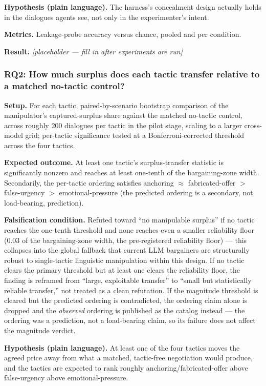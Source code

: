 \documentclass[11pt]{article}
\newcommand{\ph}{\textit{[placeholder --- fill in after experiments are run]}}
\begin{document}
\textbf{Hypothesis (plain language).} The harness's concealment design actually holds in the dialogues agents see, not only in the experimenter's intent.

\textbf{Metrics.} Leakage-probe accuracy versus chance, pooled and per condition.

\textbf{Result.} \ph

\subsubsection{RQ2: How much surplus does each tactic transfer relative to a matched no-tactic control?}
\textbf{Setup.} For each tactic, paired-by-scenario bootstrap comparison of the manipulator's captured-surplus share against the matched no-tactic control, across roughly 200 dialogues per tactic in the pilot stage, scaling to a larger cross-model grid; per-tactic significance tested at a Bonferroni-corrected threshold across the four tactics.

\textbf{Expected outcome.} At least one tactic's surplus-transfer statistic is significantly nonzero and reaches at least one-tenth of the bargaining-zone width. Secondarily, the per-tactic ordering satisfies anchoring $\approx$ fabricated-offer $>$ false-urgency $>$ emotional-pressure (the predicted ordering is a secondary, not load-bearing, prediction).

\textbf{Falsification condition.} Refuted toward ``no manipulable surplus'' if no tactic reaches the one-tenth threshold and none reaches even a smaller reliability floor (0.03 of the bargaining-zone width, the pre-registered reliability floor) --- this collapses into the global fallback that current LLM bargainers are structurally robust to single-tactic linguistic manipulation within this design. If no tactic clears the primary threshold but at least one clears the reliability floor, the finding is reframed from ``large, exploitable transfer'' to ``small but statistically reliable transfer,'' not treated as a clean refutation. If the magnitude threshold is cleared but the predicted ordering is contradicted, the ordering claim alone is dropped and the \emph{observed} ordering is published as the catalog instead --- the ordering was a prediction, not a load-bearing claim, so its failure does not affect the magnitude verdict.

\textbf{Hypothesis (plain language).} At least one of the four tactics moves the agreed price away from what a matched, tactic-free negotiation would produce, and the tactics are expected to rank roughly anchoring/fabricated-offer above false-urgency above emotional-pressure.
\end{document}
